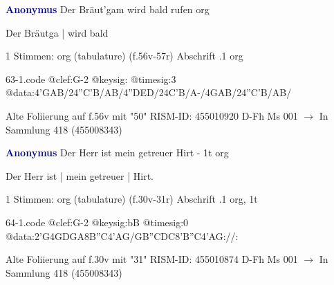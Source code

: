 \documentclass[twocolumn]{book}
\begin{document}
\newline \par \vspace{7pt} \textcolor{darkblue}{\textbf{Anonymus  }}
\newline Der Bräut'gam wird bald rufen
\newline org
\newline \begin{itshape}[f.56v, at left:] Der Bräutga | wird bald\end{itshape} 
\newline \textcolor{darkblue}{}  1 Stimmen: org (tabulature)  (f.56v-57r)
\newline Abschrift
.1  org  
\begin{filecontents*}{63-1.code}
@clef:G-2
@keysig:
@timesig:3
@data:4'GAB/24''C'B/AB/4''DED/24C'B/A-/4GAB/24''C'B/AB/
\end{filecontents*}
\newline
%
\newline Alte Foliierung auf f.56v mit "50"
\newline RISM-ID: 455010920
\newline D-Fh  Ms 001
\newline $\rightarrow$ In Sammlung 418 (455008343)
      
\newline \par \vspace{7pt} \textcolor{darkblue}{\textbf{Anonymus  }}
\newline Der Herr ist mein getreuer Hirt - 1t
\newline org
\newline \begin{itshape}[f.30v, at left:] Der Herr ist | mein getreuer | Hirt.\end{itshape} 
\newline \textcolor{darkblue}{}  1 Stimmen: org (tabulature)  (f.30v-31r)
\newline Abschrift
.1  org, 1t  
\begin{filecontents*}{64-1.code}
@clef:G-2
@keysig:bB
@timesig:0
@data:2'G4GDGA{8B''C}4'AG/GB''CDC{8'B''C}4'AG://:
\end{filecontents*}
\newline
%
\newline Alte Foliierung auf f.30v mit "31"
\newline RISM-ID: 455010874
\newline D-Fh  Ms 001
\newline $\rightarrow$ In Sammlung 418 (455008343)
      
\end{document}
